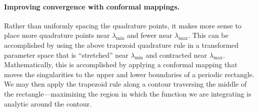 \paragraph{Improving convergence with conformal mappings.}
Rather than uniformly spacing the quadrature points, it makes more sense to place more quadrature points near $\lambda_\text{min}$ and fewer near $\lambda_\text{max}$.
This can be accomplished by using the above trapezoid quadrature rule in a {transformed parameter space} that is ``stretched'' near $\lambda_\text{min}$ and contracted near $\lambda_\text{max}$. Mathematically, this is accomplished by applying a conformal mapping that moves the singularities to the upper and lower boundaries of a periodic rectangle. We may then apply the trapezoid rule along a contour traversing the middle of the rectangle---maximizing the region in which the function we are integrating is analytic around the contour.

